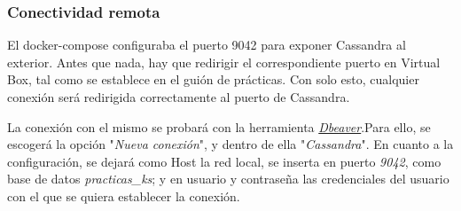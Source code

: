 \documentclass{article}
\begin{document}
\subsubsection{Conectividad remota}

El docker-compose configuraba el puerto 9042 para exponer Cassandra al exterior.  Antes que nada, hay que redirigir el correspondiente puerto en Virtual Box, tal como se establece en el guión de prácticas. Con solo esto, cualquier conexión será redirigida correctamente al puerto de Cassandra.

La conexión con el mismo se probará con la herramienta \textit{\textcolor{blue}{\href{https://dbeaver.com/download/enterprise/}{Dbeaver}}}.Para ello, se escogerá la opción "\textit{Nueva conexión}", y dentro de ella "\textit{Cassandra}". En cuanto a la configuración, se dejará como Host la red local, se inserta en puerto \textit{9042}, como base de datos \textit{practicas\_ks}; y en usuario y contraseña las credenciales del usuario con el que se quiera establecer la conexión. 
\end{document}
